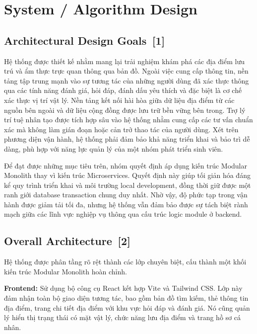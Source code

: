 \documentclass[12pt, a4paper]{article}
\begin{document}
\section{System / Algorithm Design}

\subsection[Architectural Design Goals]{Architectural Design Goals \,{\normalfont\small\textcolor{cyan!70!black}{[1]}}}
Hệ thống được thiết kế nhằm mang lại trải nghiệm khám phá các địa điểm lưu trú và ẩm thực trực quan thông qua bản đồ. Ngoài việc cung cấp thông tin, nền tảng tập trung mạnh vào sự tương tác của những người dùng đã xác thực thông qua các tính năng đánh giá, hỏi đáp, đánh dấu yêu thích và đặc biệt là cơ chế xác thực vị trí vật lý. Nền tảng kết nối hài hòa giữa dữ liệu địa điểm từ các nguồn bên ngoài và dữ liệu cộng đồng được lưu trữ bền vững bên trong. Trợ lý trí tuệ nhân tạo được tích hợp sâu vào hệ thống nhằm cung cấp các tư vấn chuẩn xác mà không làm gián đoạn hoặc cản trở thao tác của người dùng. Xét trên phương diện vận hành, hệ thống phải đảm bảo khả năng triển khai và bảo trì dễ dàng, phù hợp với năng lực quản lý của một nhóm phát triển sinh viên.

Để đạt được những mục tiêu trên, nhóm quyết định áp dụng kiến trúc Modular Monolith thay vì kiến trúc Microservices. Quyết định này giúp tối giản hóa đáng kể quy trình triển khai và môi trường local development, đồng thời giữ được một ranh giới database transaction chung duy nhất. Nhờ vậy, độ phức tạp trong vận hành được giảm tải tối đa, nhưng hệ thống vẫn đảm bảo được sự tách biệt rành mạch giữa các lĩnh vực nghiệp vụ thông qua cấu trúc logic module ở backend.

\subsection[Overall Architecture]{Overall Architecture \,{\normalfont\small\textcolor{cyan!70!black}{[2]}}}

Hệ thống được phân tầng rõ rệt thành các lớp chuyên biệt, cấu thành một khối kiến trúc Modular Monolith hoàn chỉnh.

\textbf{Frontend:}
Sử dụng bộ công cụ React kết hợp Vite và Tailwind CSS. Lớp này đảm nhận toàn bộ giao diện tương tác, bao gồm bản đồ tìm kiếm, thẻ thông tin địa điểm, trang chi tiết địa điểm với khu vực hỏi đáp và đánh giá. Nó cũng quản lý hiển thị trạng thái có mặt vật lý, chức năng lưu địa điểm và trang hồ sơ cá nhân.
\end{document}
